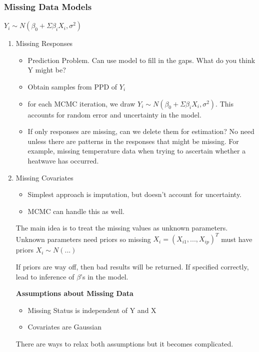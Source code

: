 \documentclass[11pt]{article}
\begin{document}
\subsubsection{Missing Data Models}
\label{sec:org00a0d66}

\(Y_i \sim N(\beta_0 + \Sigma \beta_i X_i, \sigma^2)\)


\begin{enumerate}
\item Missing Responses
\label{sec:org5264b0f}

\begin{itemize}
\item Prediction Problem. Can use model to fill in the gaps. What do you think Y might be?
\item Obtain samples from PPD of \(Y_i\)
\item for each MCMC iteration, we draw \(Y_i \sim N(\beta_0 + \Sigma \beta_i X_i, \sigma^2)\). This accounts for random error and uncertainty in the model.
\item If only responses are missing, can we delete them for estimation? No need unless there are patterns in the responses that might be missing. For example, missing temperature data when trying to ascertain whether a heatwave has occurred.
\end{itemize}

\item Missing Covariates
\label{sec:org7cbd6da}
\begin{itemize}
\item Simplest approach is imputation, but doesn't account for uncertainty.
\item MCMC can handle this as well.
\end{itemize}

The main idea is to treat the missing values as unknown parameters. Unknown parameters need priors so missing \(X_i = (X_{i1}, ..., X_{ip})^T\) must have priors \(X_i \sim N(...)\)

If priors are way off, then bad results will be returned.
If specified correctly, lead to inference of \(\beta\)'s in the model.

\textbf{Assumptions about Missing Data}
\begin{itemize}
\item Missing Status is independent of Y and X
\item Covariates are Gaussian
\end{itemize}

There are ways to relax both assumptions but it becomes complicated.


\end{enumerate}
\end{document}
